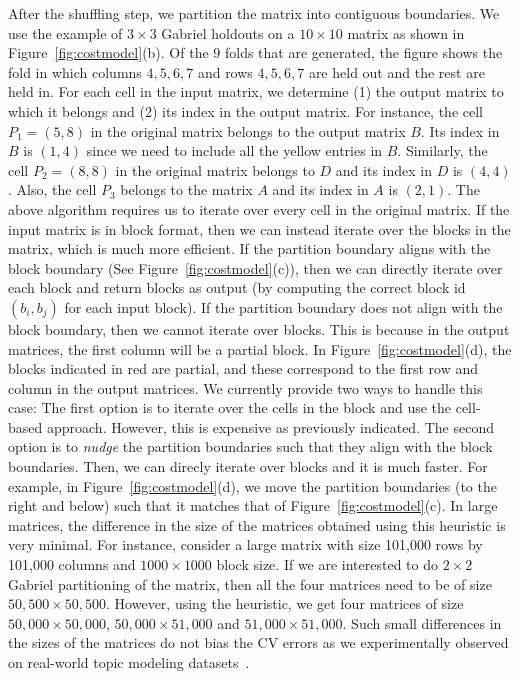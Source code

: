 \documentclass{vldb}
\newcommand{\topicnoul}[1]{\par \smallskip \smallskip \noindent{\bf {#1}}}
\begin{document}
\topicnoul{Partitioning:} After the shuffling step, we partition the matrix into
contiguous boundaries. We use the example of $3\times 3$ Gabriel holdouts on a
$10\times 10$ matrix as shown in Figure~\ref{fig:costmodel}(b). Of the $9$ folds
that are generated, the figure shows the fold in which columns $4,5,6,7$ and
rows $4,5,6,7$ are held out and the rest are held in. For each cell in the input
matrix, we determine (1) the output matrix to which it belongs and (2) its index
in the output matrix. For instance, the cell $P_1 = (5,8)$ in the original
matrix belongs to the output matrix $B$. Its index in $B$ is $(1,4)$ since we
need to include all the yellow entries in $B$. Similarly, the cell $P_2 = (8,8)$
in the original matrix belongs to $D$ and its index in $D$ is $(4,4)$. Also, the
cell $P_3$ belongs to the matrix $A$ and its index in $A$ is $(2,1)$. 
The above algorithm requires us to iterate over every cell in the original matrix. 
If the input matrix is in block format, then we can instead iterate over the blocks in
the matrix, which is much more efficient.
If the partition boundary aligns with the block boundary (See
Figure~\ref{fig:costmodel}(c)), then we
can directly iterate over each block and return blocks as output (by computing
the correct block id $(b_i, b_j)$ for each input block).
If the partition boundary does not align with
the block boundary, then we cannot iterate over blocks. This is because in the
output matrices, the first column will be a partial block. 
In Figure~\ref{fig:costmodel}(d), the blocks indicated in red are partial, and
these correspond to the first row and column in the output matrices.
We currently provide two ways to handle this case: 
The first option is to iterate over the cells in
the block and use the cell-based approach. However, this is expensive as
previously indicated. The second option is to {\em nudge} the
partition boundaries such that they align with the block boundaries. Then, we
can direcly iterate over blocks and it is much faster. For example, in
Figure~\ref{fig:costmodel}(d), we move the partition boundaries (to the right
and below) such that it matches that of Figure~\ref{fig:costmodel}(c).
In large matrices, the difference in the size of the matrices obtained using this heuristic is very
minimal. For instance, consider a large matrix with size 101,000 rows by 101,000
columns and $1000 \times 1000$ block size. If we are interested to do $2\times
2$ Gabriel partitioning of the matrix, then all the four matrices need to be of
size $50,500 \times 50,500$. However, using the heuristic, we get four matrices of
size $50,000 \times 50,000$, $50,000\times 51,000$ and $51,000 \times 51,000$.
Such small differences in the sizes of the matrices do not bias the CV errors as
we experimentally observed on real-world topic modeling datasets~\cite{nips2010}.
\end{document}
